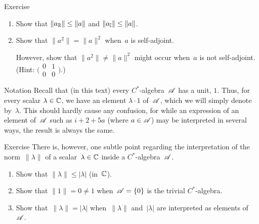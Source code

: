 \documentclass[a]{subfiles}
\begin{document}
\begin{parsec}
\begin{point}{Exercise}
\begin{enumerate}
\item
Show that $\|a_{\mathbb{R}}\|\leq \|a\|$ and $\|a_{\mathbb{I}}\|\leq \|a\|$.
\item
Show that $\|a^2\|=\|a\|^2$ when~$a$ is self-adjoint.

However,
show that $\|a^2\|\neq \|a\|^2$ might occur
when~$a$ is not self-adjoint.
(Hint: $\bigl(
\begin{smallmatrix}
	0&1\\
	0&0
\end{smallmatrix}
\bigr)$.)

\end{enumerate}
\end{point}
\end{parsec}
\begin{parsec}%
\begin{point}{Notation}%
Recall that (in this text) every $C^*$-algebra~$\mathscr{A}$ has a unit, $1$.
Thus, for every scalar $\lambda\in \mathbb{C}$,
we have an element $\lambda\cdot 1$ of~$\mathscr{A}$,
which we will simply denote by~$\lambda$.
This should hardly cause any confusion,
for while an expression of an element of~$\mathscr{A}$
such as $i+2+5a$ (where $a\in \mathscr{A}$) 
may be interpreted in several ways,
the result is always the same.
\end{point}
\begin{point}{Exercise}%
There is, however, one subtle point regarding
the interpretation
of the norm~$\|\lambda\|$ of a
scalar~$\lambda\in \mathbb{C}$ inside a $C^*$-algebra~$\mathscr{A}$.
\begin{enumerate}
\item 
Show that $\|\lambda\|\leq \left| \lambda\right|$ (in~$\mathbb{C}$).
\item
Show that $\|1\|=0\neq 1$ when~$\mathscr{A}=\{0\}$ is the trivial $C^*$-algebra.
\item
Show that~$\|\lambda\|=\left|\lambda\right|$
when~$\|\lambda\|$ and~$\left|\lambda\right|$
are interpreted as elements of~$\mathscr{A}$.
\end{enumerate}
\end{point}
\end{parsec}
\end{document}
